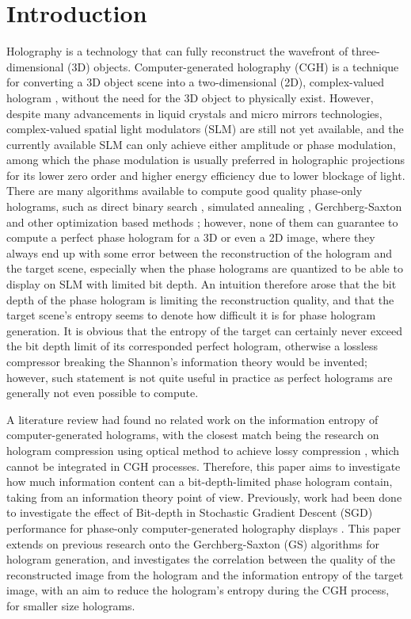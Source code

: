 \section{Introduction}
	Holography is a technology that can fully reconstruct the wavefront of three-dimensional (3D) objects. Computer-generated holography (CGH) is a technique for converting a 3D object scene into a two-dimensional (2D), complex-valued hologram \cite{Tsang2018}, without the need for the 3D object to physically exist. However, despite many advancements in liquid crystals and micro mirrors technologies, complex-valued spatial light modulators (SLM) are still not yet available, and the currently available SLM can only achieve either amplitude or phase modulation, among which the phase modulation is usually preferred in holographic projections for its lower zero order and higher energy efficiency due to lower blockage of light. There are many algorithms available to compute good quality phase-only holograms, such as direct binary search \cite{Seldowitz1987}, simulated annealing \cite{Kirkpatrick1983}, Gerchberg-Saxton \cite{Gerchberg1972} and other optimization based methods \cite{Zhang2017, Liu2020, Choi2021, Chen2021, Kadis2022, Sha2023}; however, none of them can guarantee to compute a perfect phase hologram for a 3D or even a 2D image, where they always end up with some error between the reconstruction of the hologram and the target scene, especially when the phase holograms are quantized to be able to display on SLM with limited bit depth. An intuition therefore arose that the bit depth of the phase hologram is limiting the reconstruction quality, and that the target scene's entropy seems to denote how difficult it is for phase hologram generation. It is obvious that the entropy of the target can certainly never exceed the bit depth limit of its corresponded perfect hologram, otherwise a lossless compressor breaking the Shannon's information theory \cite{Shannon1948} would be invented; however, such statement is not quite useful in practice as perfect holograms are generally not even possible to compute. 
	
	A literature review had found no related work on the information entropy of computer-generated holograms, with the closest match being the research on hologram compression using optical method to achieve lossy compression \cite{Kollin1988}, which cannot be integrated in CGH processes. Therefore, this paper aims to investigate how much information content can a bit-depth-limited phase hologram contain, taking from an information theory point of view. Previously, work had been done to investigate the effect of Bit-depth in Stochastic Gradient Descent (SGD) performance for phase-only computer-generated holography displays \cite{Kadis2022}. This paper extends on previous research onto the Gerchberg-Saxton (GS) \cite{Gerchberg1972} algorithms for hologram generation, and investigates the correlation between the quality of the reconstructed image from the hologram and the information entropy of the target image, with an aim to reduce the hologram's entropy during the CGH process, for smaller size holograms.
	
